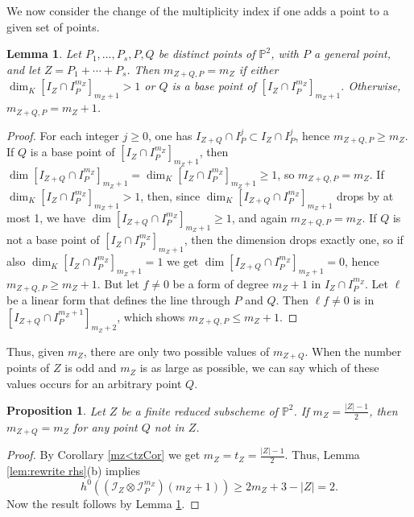 \documentclass[12pt]{amsart}
\numberwithin{equation}{section}
\newtheorem{proposition}[theorem]{Proposition}
\newtheorem{lemma}[theorem]{Lemma}
\theoremstyle{definition}
\begin{document}
We now consider the change of the multiplicity index if one adds a point to a given set of points. 

\begin{lemma} \label{lem:change of index}
Let $P_1,\ldots,P_s,P,Q$ be distinct points of ${ \ensuremath{\mathbb{P}}}^2$,  with $P$ a general point, and let $Z=P_1+\cdots+P_s$.
Then $m_{Z+Q,P}=m_Z$ if either $\dim_K [I_Z\cap I_P^{m_Z}]_{m_Z+1}>1$ or
$Q$ is a base point of $[I_Z\cap I_P^{m_Z}]_{m_Z+1}$. Otherwise, 
$m_{Z+Q,P}=m_Z+1$.
\end{lemma}

\begin{proof}
For each integer $j \ge 0$, one has $I_{Z+Q} \cap I_P^j \subset I_Z \cap I_P^j$,
hence $m_{Z+Q,P}\geq m_Z$. If $Q$ is a base point of $[I_Z\cap I_P^{m_Z}]_{m_Z+1}$,
then $\dim[I_{Z+Q}\cap I_P^{m_Z}]_{m_Z+1}= \dim_K [I_Z\cap I_P^{m_Z}]_{m_Z+1}\geq 1$,
so $m_{Z+Q,P}=m_Z$. If $\dim_K [I_Z\cap I_P^{m_Z}]_{m_Z+1}>1$, then, since
$\dim_K [I_{Z+Q}\cap I_P^{m_Z}]_{m_Z+1}$ drops by at most 1, we have 
$\dim[I_{Z+Q}\cap I_P^{m_Z}]_{m_Z+1}\geq 1$, and again $m_{Z+Q,P}=m_Z$.
If $Q$ is not a base point of $[I_Z\cap I_P^{m_Z}]_{m_Z+1}$, then the dimension
drops exactly one, so if also $\dim_K [I_Z\cap I_P^{m_Z}]_{m_Z+1}=1$
we get $\dim[I_{Z+Q}\cap I_P^{m_Z}]_{m_Z+1}= 0$, hence $m_{Z+Q,P}\geq m_Z+1$.
But let $f \neq 0$ be a form of degree $m_Z + 1$ 
in $I_Z \cap I_P^{m_Z}$. Let $\ell$ be a linear form that defines the line through $P$ and $Q$. Then 
$\ell f \neq 0$ is in $[I_{Z+Q} \cap I_P^{m_Z+1}]_{m_Z+2}$, which shows $m_{Z+Q, P} \le m_Z+1$. 
\end{proof} 

Thus, given $m_Z$, there are only two possible values of $m_{Z+Q}$. 
When the number points of $Z$ is odd and  $m_Z$ is as large as possible, we can say which of these values occurs for an arbitrary point $Q$.

\begin{proposition} \label{prop:change of mZ, max mZ}
Let $Z$ be a finite reduced subscheme of ${ \ensuremath{\mathbb{P}}}^2$.
If $m_Z = \frac{|Z| - 1}{2}$, then $m_{Z + Q} = m_Z$ for any point $Q$ not in $Z$.
\end{proposition} 

\begin{proof}
By Corollary \ref{mz<tzCor} we get $m_Z=t_Z = \frac{|Z|-1}{2}$.  Thus,  Lemma \ref{lem:rewrite rhs}(b) implies 
\[
h^0((\mathcal I_Z \otimes \mathcal I_P^{m_Z})(m_Z+1)) \ge 
2m_Z + 3 - |Z| =2. 
\]
Now the result follows by Lemma \ref{lem:change of index}.
\end{proof}
\end{document}
